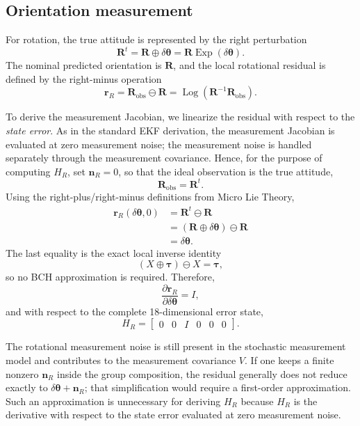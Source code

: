 \documentclass[11pt]{article}
\newcommand{\R}{\mathbf{R}}
\newcommand{\Exp}{\operatorname{Exp}}
\newcommand{\Log}{\operatorname{Log}}
\begin{document}
\subsection{Orientation measurement}
For rotation, the true attitude is represented by the right perturbation
\begin{equation}
\R^t
=
\R\oplus\delta\bm\theta
=
\R\Exp(\delta\bm\theta).
\end{equation}
The nominal predicted orientation is $\R$, and the local rotational residual is defined by the right-minus operation
\begin{equation}
\bm r_R
=
\R_{\mathrm{obs}}\ominus\R
=
\Log\!\left(\R^{-1}\R_{\mathrm{obs}}\right).
\end{equation}

To derive the measurement Jacobian, we linearize the residual with respect to the \emph{state error}.  As in the standard EKF derivation, the measurement Jacobian is evaluated at zero measurement noise; the measurement noise is handled separately through the measurement covariance.  Hence, for the purpose of computing $H_R$, set $\bm n_R=0$, so that the ideal observation is the true attitude,
\begin{equation}
\R_{\mathrm{obs}}=\R^t.
\end{equation}
Using the right-plus/right-minus definitions from Micro Lie Theory,
\begin{align}
\bm r_R(\delta\bm\theta,0)
&=
\R^t\ominus\R\\
&=
(\R\oplus\delta\bm\theta)\ominus\R\\
&=
\delta\bm\theta.
\end{align}
The last equality is the exact local inverse identity
\begin{equation}
(X\oplus\bm\tau)\ominus X=\bm\tau,
\end{equation}
so no BCH approximation is required.  Therefore,
\begin{equation}
\frac{\partial\bm r_R}{\partial\delta\bm\theta}
=I,
\end{equation}
and with respect to the complete 18-dimensional error state,
\begin{equation}
\boxed{
H_R
=
\begin{bmatrix}
0 & 0 & I & 0 & 0 & 0
\end{bmatrix}.
}
\end{equation}

The rotational measurement noise is still present in the stochastic measurement model and contributes to the measurement covariance $V$.  If one keeps a finite nonzero $\bm n_R$ inside the group composition, the residual generally does not reduce exactly to $\delta\bm\theta+\bm n_R$; that simplification would require a first-order approximation.  Such an approximation is unnecessary for deriving $H_R$ because $H_R$ is the derivative with respect to the state error evaluated at zero measurement noise.
\end{document}
